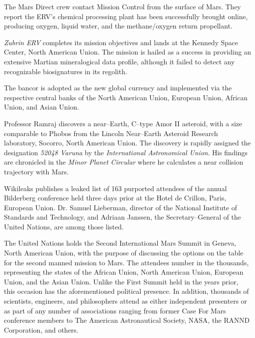 The Mars Direct crew contact Mission Control from the surface of Mars. They report the ERV's chemical processing plant has been successfully brought online, producing oxygen, liquid water, and the methane/oxygen return propellant.
\StopTimelineDate

{\it Zubrin ERV} completes its mission objectives and lands at the Kennedy Space Center, North American Union. The mission is hailed as a success in providing an extensive Martian mineralogical data profile, although it failed to detect any recognizable biosignatures in its regolith.
\StopTimelineDate

The bancor is adopted as the new global currency and implemented via the respective central banks of the North American Union, European Union, African Union, and Asian Union.
\StopTimelineDate

Professor Ramraj discovers a near--Earth, C--type Amor II asteroid, with a size comparable to Phobos from the Lincoln Near--Earth Asteroid Research laboratory, Socorro, North American Union. The discovery is rapidly assigned the designation {\it 52048 Varuna} by the {\it International Astronomical Union}. His findings are chronicled in the {\it Minor Planet Circular} where he calculates a near collision trajectory with Mars.
\StopTimelineDate

Wikileaks publishes a leaked list of 163 purported attendees of the annual Bilderberg conference held three days prior at the Hotel de Crillon, Paris, European Union. Dr. Samuel Lieberman, director of the National Institute of Standards and Technology, and Adriaan Janssen, the Secretary--General of the United Nations, are among those listed.
\StopTimelineDate

The United Nations holds the Second International Mars Summit in Geneva, North American Union, with the purpose of discussing the options on the table for the second manned mission to Mars. The attendees number in the thousands, representing the states of the African Union, North American Union, European Union, and the Asian Union. Unlike the First Summit held in the years prior, this occasion has the aforementioned political presence. In addition, thousands of scientists, engineers, and philosophers attend as either independent presenters or as part of any number of associations ranging from former Case For Mars conference members to The American Astronautical Society, NASA, the RANND Corporation, and others.

